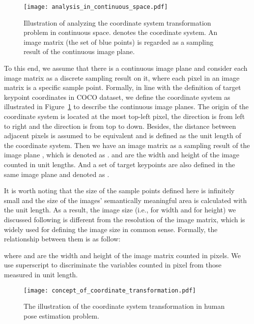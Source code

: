 \documentclass[10pt,journal,compsoc]{IEEEtran}
\begin{document}
\begin{figure}[h]
    \centering
    \texttt{[image: analysis\_in\_continuous\_space.pdf]}
    \caption{Illustration of analyzing the coordinate system transformation problem in continuous space.  denotes the coordinate system. An image matrix (the set of blue points) is regarded as a sampling result of the continuous image plane.}
    \label{fig:analysis_in_continuous_space}
\end{figure}

To this end, we assume that there is a continuous image plane and consider each image matrix as a discrete sampling result on it, where each pixel in an image matrix is a specific sample point. Formally, in line with the definition of target keypoint coordinates in COCO dataset\cite{COCO}, we define the coordinate system  as illustrated in Figure~\ref{fig:analysis_in_continuous_space} to describe the continuous image planes. The origin of the coordinate system is located at the most top-left pixel, the  direction is from left to right and the  direction is from top to down. Besides, the distance between adjacent pixels is assumed to be equivalent and is defined as the unit length of the coordinate system. Then we have an image matrix as a sampling result of the image plane , which is denoted as .  and  are the width and height of the image counted in unit lengths. And a set of target keypoints are also defined in the same image plane and denoted as .

It is worth noting that the size of the sample points defined here is infinitely small and the size of the images' semantically meaningful area is calculated with the unit length. As a result, the image size (i.e.,  for width and  for height) we discussed following is different from the resolution of the image matrix, which is widely used for defining the image size in common sense. Formally, the relationship between them is as follow:

where  and  are the width and height of the image matrix counted in pixels. We use superscript  to discriminate the variables counted in pixel from those measured in unit length.

\begin{figure}[h]
    \centering
    \texttt{[image: concept\_of\_coordinate\_transformation.pdf]}
    \caption{The illustration of the coordinate system transformation in human pose estimation problem. }
    \label{fig:concept_of_coordinate_transformation}
\end{figure}
\end{document}
